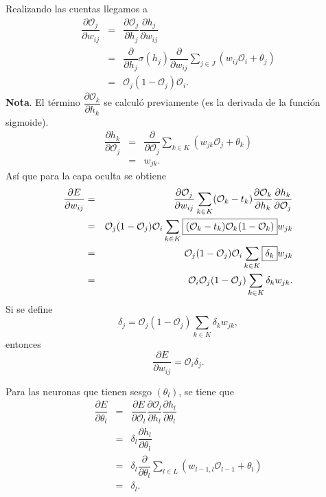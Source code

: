 \documentclass[12pt,letterpaper]{article}
\theoremstyle{definition}
\theoremstyle{definition}
\theoremstyle{definition}
\theoremstyle{definition}
\theoremstyle{definition}
\theoremstyle{definition}
\begin{document}
	Realizando las cuentas llegamos a
	\begin{eqnarray*}
		\boxed{\dfrac{\partial \mathcal{O}_{j}}{\partial  w_{i j}}}{} &=& \dfrac{\partial \mathcal{O}_{j}}{\partial  h_{j}}\dfrac{\partial h_{j}}{\partial  w_{i j}}  \\
		&=& \dfrac{\partial }{\partial  h_{j}} \sigma (h_{j}) \dfrac{\partial }{\partial  w_{i j}}  \sum_{j\in J} \left( w_{i j} \mathcal{O}_{i} + \theta_{j}\right)\\
		&=& \mathcal{O}_{j} (1-\mathcal{O}_{j}) \mathcal{O}_{i}.
	\end{eqnarray*}
	\textbf{Nota}. El término $ \dfrac{\partial \mathcal{O}_k}{\partial h_k} $ se calculó previamente (es la derivada de la función sigmoide).
	\begin{eqnarray*}
		\boxed{\dfrac{\partial h_{k}}{\partial \mathcal{O}_{j}}}{} &=&  \dfrac{\partial }{\partial \mathcal{O}_{j}} \sum_{k\in K} \left(w_{j k} \mathcal{O}_{j} + \theta_{k}\right)\\														 								&=& w_{j k}.
	\end{eqnarray*}
	Así que para la capa oculta se obtiene
	\begin{eqnarray*}
		\dfrac{\partial E}{\partial w_{i j}}&=&\textcolor{black}{\dfrac{\partial \mathcal{O}_{j}}{\partial w_{i j}}}\sum_{k\in K} (\mathcal{O}_{k}-t_{k}) \textcolor{black}{\dfrac{\partial \mathcal{O}_{k}}{\partial h_{k}}}\dfrac{\partial h_{k}}{\partial \mathcal{O}_{j}}\\
		&=&\textcolor{black}{\mathcal{O}_{j} (1-\mathcal{O}_{j}) \mathcal{O}_{i}} \sum_{k\in K} \boxed{(\mathcal{O}_{k}-t_{k}) \textcolor{black}{\mathcal{O}_{k} (1-\mathcal{O}_{k})}}w_{j k}\\
		&=&\textcolor{black}{\mathcal{O}_{j} (1-\mathcal{O}_{j}) \mathcal{O}_{i}} \sum_{k\in K} \boxed{\delta_{k}}w_{j k}\\
		&=&\textcolor{black}{\mathcal{O}_{i} \mathcal{O}_{j} (1-\mathcal{O}_{j})}  \sum_{k\in K} \delta_{k}w_{j k}.
	\end{eqnarray*}
	Si se define 
	\[ \delta_{j} = \mathcal{O}_{j} (1-\mathcal{O}_{j})  \sum_{k\in K} \delta_{k} w_{j k}, \]
	entonces 
	\[ \dfrac{\partial E}{\partial w_{i j}} = \mathcal{O}_{i} \delta_{j}. \]
	
	Para las neuronas que tienen sesgo $ (\theta_l) $, se tiene que 
	\begin{eqnarray*}
		\dfrac{\partial E}{\partial \theta_l}&=&\boxed{\dfrac{\partial E}{\partial \mathcal{O}_l}\dfrac{\partial \mathcal{O}_l}{\partial h_l}}{}\dfrac{\partial h_l}{\partial \theta_l}\\
		&=& \boxed{\delta_l} \dfrac{\partial h_l}{\partial \theta_l}\\
		&=& \delta_l\dfrac{\partial}{\partial \theta_l}\sum_{l\in L}\left( w_{l-1,l} \mathcal{O}_{l-1} + \theta_l\right)\\
		&=& \delta_l.
	\end{eqnarray*}
	
\end{document}
